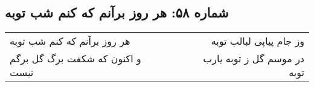 \begin{center}
\section*{شماره ۵۸: هر روز برآنم که کنم شب توبه}
\label{sec:058}
\begin{longtable}{l p{0.5cm} r}
هر روز برآنم که کنم شب توبه
&&
وز جام پیاپی لبالب توبه
\\
و اکنون که شکفت برگ گل برگم نیست
&&
در موسم گل ز توبه یارب توبه
\\
\end{longtable}
\end{center}

